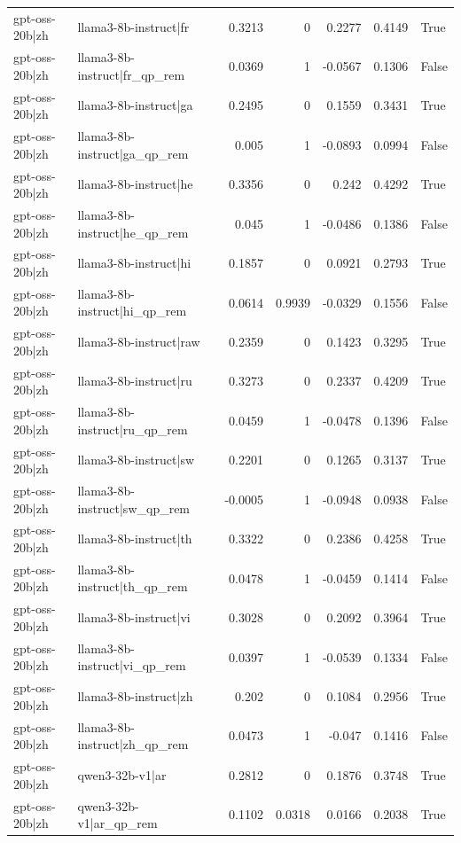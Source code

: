 \begin{table}
\begin{tabular}{l l r r r r l}
gpt-oss-20b|zh & llama3-8b-instruct|fr & 0.3213 & 0 & 0.2277 & 0.4149 & True \\
gpt-oss-20b|zh & llama3-8b-instruct|fr_qp_rem & 0.0369 & 1 & -0.0567 & 0.1306 & False \\
gpt-oss-20b|zh & llama3-8b-instruct|ga & 0.2495 & 0 & 0.1559 & 0.3431 & True \\
gpt-oss-20b|zh & llama3-8b-instruct|ga_qp_rem & 0.005 & 1 & -0.0893 & 0.0994 & False \\
gpt-oss-20b|zh & llama3-8b-instruct|he & 0.3356 & 0 & 0.242 & 0.4292 & True \\
gpt-oss-20b|zh & llama3-8b-instruct|he_qp_rem & 0.045 & 1 & -0.0486 & 0.1386 & False \\
gpt-oss-20b|zh & llama3-8b-instruct|hi & 0.1857 & 0 & 0.0921 & 0.2793 & True \\
gpt-oss-20b|zh & llama3-8b-instruct|hi_qp_rem & 0.0614 & 0.9939 & -0.0329 & 0.1556 & False \\
gpt-oss-20b|zh & llama3-8b-instruct|raw & 0.2359 & 0 & 0.1423 & 0.3295 & True \\
gpt-oss-20b|zh & llama3-8b-instruct|ru & 0.3273 & 0 & 0.2337 & 0.4209 & True \\
gpt-oss-20b|zh & llama3-8b-instruct|ru_qp_rem & 0.0459 & 1 & -0.0478 & 0.1396 & False \\
gpt-oss-20b|zh & llama3-8b-instruct|sw & 0.2201 & 0 & 0.1265 & 0.3137 & True \\
gpt-oss-20b|zh & llama3-8b-instruct|sw_qp_rem & -0.0005 & 1 & -0.0948 & 0.0938 & False \\
gpt-oss-20b|zh & llama3-8b-instruct|th & 0.3322 & 0 & 0.2386 & 0.4258 & True \\
gpt-oss-20b|zh & llama3-8b-instruct|th_qp_rem & 0.0478 & 1 & -0.0459 & 0.1414 & False \\
gpt-oss-20b|zh & llama3-8b-instruct|vi & 0.3028 & 0 & 0.2092 & 0.3964 & True \\
gpt-oss-20b|zh & llama3-8b-instruct|vi_qp_rem & 0.0397 & 1 & -0.0539 & 0.1334 & False \\
gpt-oss-20b|zh & llama3-8b-instruct|zh & 0.202 & 0 & 0.1084 & 0.2956 & True \\
gpt-oss-20b|zh & llama3-8b-instruct|zh_qp_rem & 0.0473 & 1 & -0.047 & 0.1416 & False \\
gpt-oss-20b|zh & qwen3-32b-v1|ar & 0.2812 & 0 & 0.1876 & 0.3748 & True \\
gpt-oss-20b|zh & qwen3-32b-v1|ar_qp_rem & 0.1102 & 0.0318 & 0.0166 & 0.2038 & True \\

\end{tabular}
\end{table}
